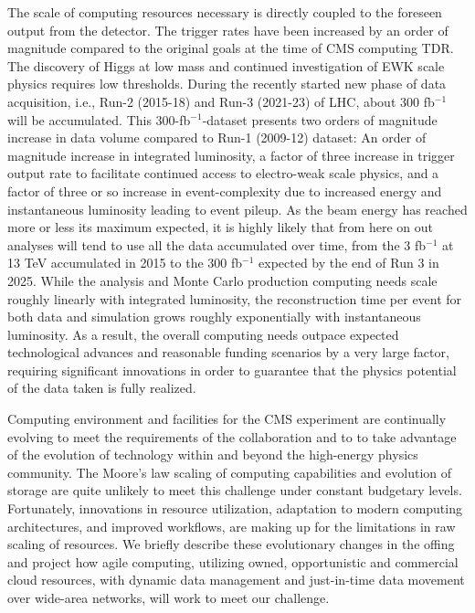 \documentclass[11pt,a4paper]{article}
\begin{document}
The scale of computing resources necessary is directly coupled to the
foreseen output from the detector.  The trigger rates have been
increased by an order of magnitude compared to the original goals at
the time of CMS computing TDR. The discovery of Higgs at low mass and
continued investigation of EWK scale physics requires low thresholds.
During the recently started new
phase of data acquisition, i.e., Run-2 (2015-18) and Run-3 (2021-23)
of LHC, about 300 fb$^{-1}$ will be accumulated. This
300-fb$^{-1}$-dataset presents two orders of magnitude increase in
data volume compared to Run-1 (2009-12) dataset: An order of magnitude
increase in integrated luminosity, a factor of three increase in
trigger output rate to facilitate continued access to electro-weak
scale physics, and a factor of three or so increase in
event-complexity due to increased energy and instantaneous luminosity
leading to event pileup.
As the beam energy has reached more or less its maximum expected, it
is highly likely that from here on out analyses will tend to use all
the data accumulated over time, from the 3 fb$^{-1}$ at 13 TeV accumulated in 2015 to
the 300 fb$^{-1}$ expected by the end of Run 3 in 2025.
While the analysis and Monte Carlo production computing needs scale
roughly linearly with integrated luminosity, the reconstruction time
per event for both data and simulation grows roughly exponentially
with instantaneous luminosity.  As a result, the overall computing
needs outpace expected technological advances and reasonable 
funding scenarios by a very large factor,
requiring significant innovations in order to guarantee that the
physics potential of the data taken is fully realized.

Computing environment and facilities for the CMS experiment are
continually evolving to meet the requirements of the collaboration and
to to take advantage of the evolution of technology within and beyond
the high-energy physics community. 
The Moore's law scaling of computing capabilities and evolution of
storage are quite unlikely to meet this challenge under constant
budgetary levels. Fortunately, innovations in resource utilization,
adaptation to modern computing architectures, and improved workflows,
are making up for the limitations in raw scaling of resources. We
briefly describe these evolutionary changes in the offing and project
how agile computing, utilizing owned, opportunistic and commercial
cloud resources, with dynamic data management and just-in-time data
movement over wide-area networks, will work to meet our challenge. 
\end{document}
